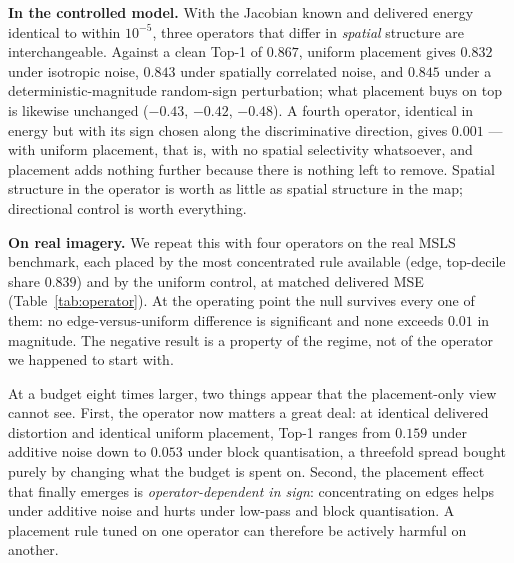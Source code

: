 \documentclass[10pt,journal]{IEEEtran}
\begin{document}
\textbf{In the controlled model.} With the Jacobian known and delivered energy
identical to within $10^{-5}$, three operators that differ in \emph{spatial}
structure are interchangeable. Against a clean Top-1 of $0.867$, uniform
placement gives $0.832$ under isotropic noise, $0.843$ under spatially
correlated noise, and $0.845$ under a deterministic-magnitude random-sign
perturbation; what placement buys on top is likewise unchanged ($-0.43$,
$-0.42$, $-0.48$). A fourth operator, identical in energy but with its sign
chosen along the discriminative direction, gives $0.001$ --- with uniform
placement, that is, with no spatial selectivity whatsoever, and placement adds
nothing further because there is nothing left to remove. Spatial structure in
the operator is worth as little as spatial structure in the map; directional
control is worth everything.

\textbf{On real imagery.} We repeat this with four operators on the real MSLS
benchmark, each placed by the most concentrated rule available (edge,
top-decile share $0.839$) and by the uniform control, at matched delivered
MSE (Table~\ref{tab:operator}). At the operating point the null survives every
one of them: no edge-versus-uniform difference is significant and none exceeds
$0.01$ in magnitude. The negative result is a property of the regime, not of
the operator we happened to start with.

At a budget eight times larger, two things appear that the placement-only view
cannot see. First, the operator now matters a great deal: at identical
delivered distortion and identical uniform placement, Top-1 ranges from
$0.159$ under additive noise down to $0.053$ under block quantisation, a
threefold spread bought purely by changing what the budget is spent on.
Second, the placement effect that finally emerges is \emph{operator-dependent
in sign}: concentrating on edges helps under additive noise and hurts under
low-pass and block quantisation. A placement rule tuned on one operator can
therefore be actively harmful on another.
\end{document}
